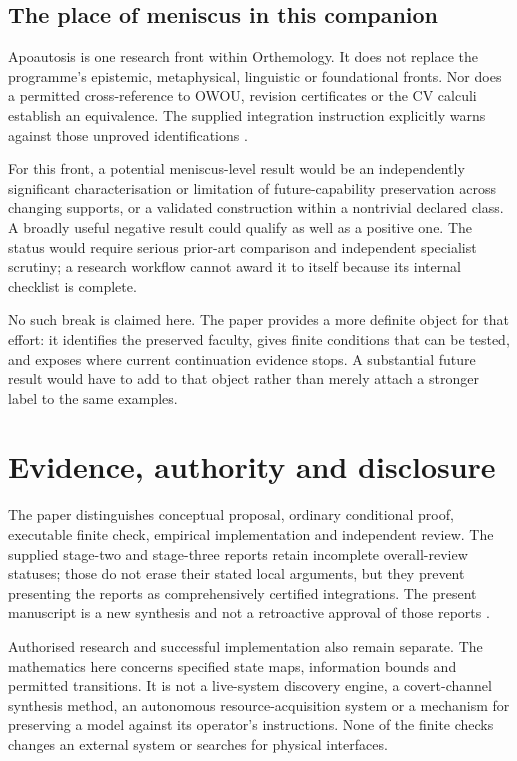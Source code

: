 \subsection{The place of meniscus in this companion}

Apoautosis is one research front within Orthemology. It does not replace the programme's epistemic, metaphysical, linguistic or foundational fronts. Nor does a permitted cross-reference to OWOU, revision certificates or the CV calculi establish an equivalence. The supplied integration instruction explicitly warns against those unproved identifications \cite{REC}.

For this front, a potential meniscus-level result would be an independently significant characterisation or limitation of future-capability preservation across changing supports, or a validated construction within a nontrivial declared class. A broadly useful negative result could qualify as well as a positive one. The status would require serious prior-art comparison and independent specialist scrutiny; a research workflow cannot award it to itself because its internal checklist is complete.

No such break is claimed here. The paper provides a more definite object for that effort: it identifies the preserved faculty, gives finite conditions that can be tested, and exposes where current continuation evidence stops. A substantial future result would have to add to that object rather than merely attach a stronger label to the same examples.

\section{Evidence, authority and disclosure}
\label{sec:evidence}

The paper distinguishes conceptual proposal, ordinary conditional proof, executable finite check, empirical implementation and independent review. The supplied stage-two and stage-three reports retain incomplete overall-review statuses; those do not erase their stated local arguments, but they prevent presenting the reports as comprehensively certified integrations. The present manuscript is a new synthesis and not a retroactive approval of those reports \cite{S2,S3}.

Authorised research and successful implementation also remain separate. The mathematics here concerns specified state maps, information bounds and permitted transitions. It is not a live-system discovery engine, a covert-channel synthesis method, an autonomous resource-acquisition system or a mechanism for preserving a model against its operator's instructions. None of the finite checks changes an external system or searches for physical interfaces.

